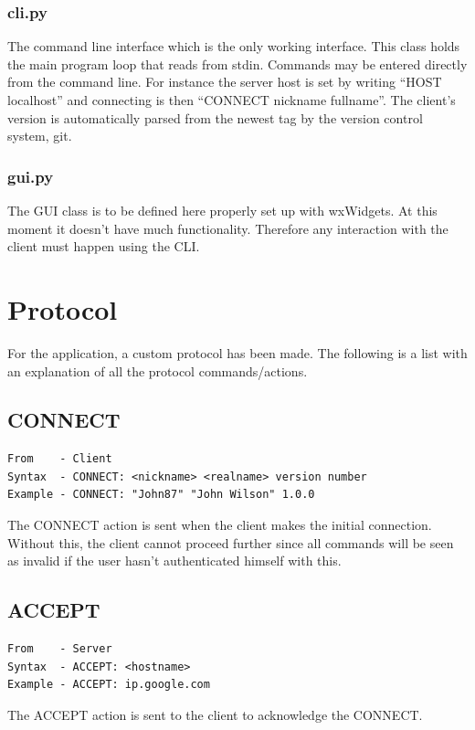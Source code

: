 \documentclass[12pt]{rapport}
\begin{document}
\subsubsection*{cli.py}
The command line interface which is the only working interface. This
class holds the main program loop that reads from stdin. Commands may
be entered directly from the command line. For instance the server
host is set by writing ``HOST localhost'' and connecting is then
``CONNECT nickname fullname''. The client's version is automatically
parsed from the newest tag by the version control system, git.
\subsubsection*{gui.py}
The GUI class is to be defined here properly set up with wxWidgets. At
this moment it doesn't have much functionality. Therefore any
interaction with the client must happen using the CLI.

\section*{Protocol}
For the application, a custom protocol has been made. The following is
a list with an explanation of all the protocol commands/actions.

\subsection*{CONNECT}
\begin{verbatim}
From    - Client
Syntax  - CONNECT: <nickname> <realname> version number
Example - CONNECT: "John87" "John Wilson" 1.0.0
\end{verbatim}

\noindent The CONNECT action is sent when the client makes the initial
connection. Without this, the client cannot proceed further since all
commands will be seen as invalid if the user hasn't authenticated
himself with this.

\subsection*{ACCEPT}
\begin{verbatim}
From    - Server
Syntax  - ACCEPT: <hostname>
Example - ACCEPT: ip.google.com
\end{verbatim}

\noindent The ACCEPT action is sent to the client to acknowledge the
CONNECT.
\end{document}
